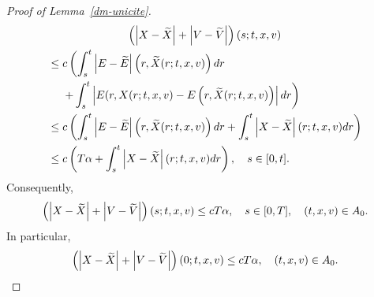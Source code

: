 \documentclass[AHL,Unicode,longabstracts,published]{cedram}
\let\oldtilde\tilde
\renewcommand*{\tilde}[1]{\mathchoice{\widetilde{#1}}{\widetilde{#1}}{\oldtilde{#1}}{\oldtilde{#1}}}
\begin{document}
\begin{proof}[{Proof of Lemma~\ref{dm-unicite}}]
\begin{multline*}
\left (\left|X-\tilde{X}\right| + \left|V-\tilde{V}\right| \right) (s;t,x,v) \\
\begin{aligned}
&\leq c \left(\int_s^t \left|E-\tilde{E}\right|\left(r,\tilde{X}(r;t,x,v)\right)dr\right.\\
&\quad\; \left.+ \int_s^t \left | E(r,X(r;t,x,v)-E\left(r,\tilde{X}(r;t,x,v)\right) \right| dr \right) \\
&\leq c \left(\int_s^t \left|E-\tilde{E}\right| \left(r,\tilde{X}(r;t,x,v)\right) dr + \int_s^t \left|X-\tilde{X}\right| (r;t,x,v) dr \right) \\
&\leq c \left(T\alpha + \int_s^t \left|X-\tilde{X}\right| (r;t,x,v) dr \right),\quad s\in [0,t].
\end{aligned}
\end{multline*}
Consequently,
\[
\left (\left|X-\tilde{X}\right| +\left|V-\tilde{V}\right| \right) (s;t,x,v) \leq cT\alpha, \quad s \in [0,T], \quad (t,x,v)\in A_0.
\]
In particular,
\begin{equation}\label{uniq-3}
\left (\left|X-\tilde{X}\right|+\left|V-\tilde{V}\right| \right)(0;t,x,v) \leq cT\alpha, \quad (t,x,v) \in A_0.
\end{equation}



\end{proof}
\end{document}
